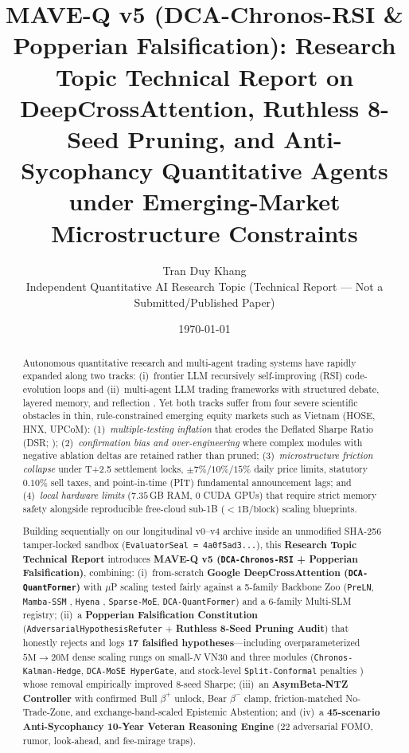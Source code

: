 \documentclass[11pt]{article}
\title{\textbf{MAVE-Q v5 (DCA-Chronos-RSI \& Popperian Falsification): Research Topic Technical Report on DeepCrossAttention, Ruthless 8-Seed Pruning, and Anti-Sycophancy Quantitative Agents under Emerging-Market Microstructure Constraints}}
\author{Tran Duy Khang \\ Independent Quantitative AI Research Topic (Technical Report --- Not a Submitted/Published Paper)}
\date{\today}
\begin{document}
\maketitle

\begin{abstract}
Autonomous quantitative research and multi-agent trading systems have rapidly expanded along two tracks: (i)~frontier LLM recursively self-improving (RSI) code-evolution loops \citep{guo2026aqua,srikanth2026aide2,zhang2025dgm,li2025rdagentq} and (ii)~multi-agent LLM trading frameworks with structured debate, layered memory, and reflection \citep{xiao2024tradingagents,yu2024finmem,zhang2024finagent}. Yet both tracks suffer from four severe scientific obstacles in thin, rule-constrained emerging equity markets such as Vietnam (HOSE, HNX, UPCoM): (1)~\emph{multiple-testing inflation} that erodes the Deflated Sharpe Ratio (DSR; \citealt{bailey2014deflated}); (2)~\emph{confirmation bias and over-engineering} where complex modules with negative ablation deltas are retained rather than pruned; (3)~\emph{microstructure friction collapse} under T+2.5 settlement locks, $\pm 7\%/10\%/15\%$ daily price limits, statutory $0.10\%$ sell taxes, and point-in-time (PIT) fundamental announcement lags; and (4)~\emph{local hardware limits} ($7.35$\,GB RAM, $0$ CUDA GPUs) that require strict memory safety alongside reproducible free-cloud sub-1B ($<1\text{B}/\text{block}$) scaling blueprints.

Building sequentially on our longitudinal v0--v4 archive inside an unmodified SHA-256 tamper-locked sandbox (\texttt{EvaluatorSeal = 4a0f5ad3...}), this \textbf{Research Topic Technical Report} introduces \textbf{MAVE-Q v5 (\texttt{DCA-Chronos-RSI} + Popperian Falsification)}, combining: (i)~from-scratch \textbf{Google DeepCrossAttention (\texttt{DCA-QuantFormer})} \citep{heddes2025dca} with $\mu$P scaling \citep{yang2022mup} tested fairly against a 5-family Backbone Zoo (\texttt{PreLN}, \texttt{Mamba-SSM} \citealt{gu2023mamba}, \texttt{Hyena} \citealt{poli2023hyena}, \texttt{Sparse-MoE}, \texttt{DCA-QuantFormer}) and a 6-family Multi-SLM registry; (ii)~a \textbf{Popperian Falsification Constitution} \citep{popper1959logic} (\texttt{AdversarialHypothesisRefuter} + \textbf{Ruthless 8-Seed Pruning Audit}) that honestly rejects and logs \textbf{17 falsified hypotheses}---including overparameterized $5\text{M}\to 20\text{M}$ dense scaling rungs on small-$N$ VN30 and three modules (\texttt{Chronos-Kalman-Hedge}, \texttt{DCA-MoSE HyperGate}, and stock-level \texttt{Split-Conformal} penalties \citealt{angelopoulos2024conformal}) whose removal empirically improved 8-seed Sharpe; (iii)~an \textbf{AsymBeta-NTZ Controller} with confirmed Bull $\beta^+$ unlock, Bear $\beta^-$ clamp, friction-matched No-Trade-Zone, and exchange-band-scaled Epistemic Abstention; and (iv)~a \textbf{45-scenario Anti-Sycophancy 10-Year Veteran Reasoning Engine} (22 adversarial FOMO, rumor, look-ahead, and fee-mirage traps).


\end{abstract}
\end{document}
